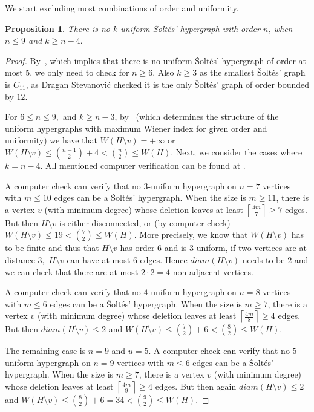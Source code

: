 \documentclass[a4paper,11pt]{article}
\newcommand*{\ceilfrac}[2]{\mathopen{}\left\lceil\frac{#1}{#2}\right\rceil\mathclose{}}
\newcommand{\diam}{diam}
\newtheorem{prop}[defi]{Proposition}
\begin{document}
We start excluding most combinations of order and uniformity.

\begin{prop}\label{prop:kunin9}
There is no $k$-uniform \v Solt\'es' hypergraph with order $n$, when
 $n \le 9$ and $k \ge n-4.$ 
\end{prop}

\begin{proof}
By~\cite[Thm. 3]{Cambie24Hyper}, which implies that there is no uniform \v Solt\'es' hypergraph of order at most $5$, we only need to check for $n \ge 6$.
Also $k \ge 3$ as the smallest \v Solt\'es' graph is $C_{11}$, as Dragan Stevanovi\'c checked it is the only \v Solt\'es' graph  of order bounded by $12.$


For $6 \le n \le 9,$ and $k \ge n-3$, by~\cite[Thm.~1]{CGSTT23+} (which determines the structure of the uniform hypergraphs with maximum Wiener index for given order and uniformity) we have that $W(H\setminus v)=+\infty$ or $W(H\setminus v)\le \binom{n-1}{2}+4 < \binom{n}{2}\le W(H) $. 
Next, we consider the cases where $k=n-4.$ All mentioned computer verification can be found at \cite[doc. ]{C25github}.
 
A computer check can verify that no $3$-uniform hypergraph on $n=7$ vertices with $m \le 10$ edges can be a \v Solt\'es' hypergraph.
When the size is $m \ge 11$, there is a vertex $v$ (with minimum degree) whose deletion leaves at least $\ceilfrac{4m}{7} \ge 7$ edges.
But then $H \setminus v$ is either disconnected, or (by computer check) $W(H \setminus v) \le 19<\binom{7}{2} \le W(H)$.
More precisely, we know that $W(H \setminus v)$ has to be finite and thus that $H \setminus v$ has order $6$ and is $3$-uniform, if two vertices are at distance $3,$ $H \setminus v$ can have at most $6$ edges. Hence $\diam(H \setminus v)$ needs to be $2$ and we can check that there are at most $2\cdot 2=4$ non-adjacent vertices.
    

 A computer check can verify that no $4$-uniform hypergraph on $n=8$ vertices with $m \le 6$ edges can be a \v Solt\'es' hypergraph.
When the size is $m \ge 7$, there is a vertex $v$ (with minimum degree) whose deletion leaves at least $\ceilfrac{4m}{8} \ge 4$ edges.
 But then $\diam(H \setminus v) \le 2$ and $W(H \setminus v) \le \binom{7}{2}+6<\binom{8}{2} \le W(H)$.


 The remaining case is $n=9$ and $u=5.$
 A computer check can verify that no $5$-uniform hypergraph on $n=9$ vertices with $m \le 6$ edges can be a \v Solt\'es' hypergraph.
 When the size is $m \ge 7$, there is a vertex $v$ (with minimum degree) whose deletion leaves at least $\ceilfrac{4m}{9} \ge 4$ edges.
 But then again $\diam(H \setminus v) \le 2$ and $W(H \setminus v) \le \binom{8}2+6=34<\binom{9}{2} \le W(H)$.
\end{proof}
\end{document}
